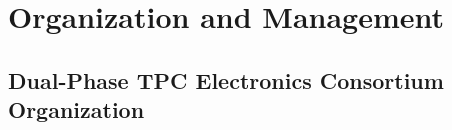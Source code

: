 





\section{Organization and Management}
\label{sec:fddp-tpc-elec-org}

\subsection{Dual-Phase TPC Electronics Consortium Organization}
\label{sec:fddp-tpc-elec-org-consortium}

